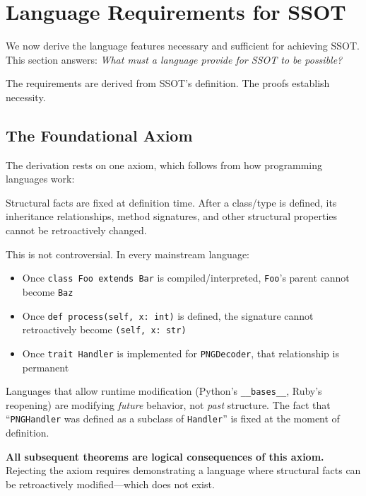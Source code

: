 \section{Language Requirements for SSOT}\label{sec:requirements}

We now derive the language features necessary and sufficient for achieving SSOT. This section answers: \emph{What must a language provide for SSOT to be possible?}

The requirements are derived from SSOT's definition. The proofs establish necessity.

\subsection{The Foundational Axiom}\label{sec:axiom}

The derivation rests on one axiom, which follows from how programming languages work:

\begin{axiom}\label{axiom:fixation}
Structural facts are fixed at definition time. After a class/type is defined, its inheritance relationships, method signatures, and other structural properties cannot be retroactively changed.
\end{axiom}

This is not controversial. In every mainstream language:
\begin{itemize}
\tightlist
\item Once \texttt{class Foo extends Bar} is compiled/interpreted, \texttt{Foo}'s parent cannot become \texttt{Baz}
\item Once \texttt{def process(self, x: int)} is defined, the signature cannot retroactively become \texttt{(self, x: str)}
\item Once \texttt{trait Handler} is implemented for \texttt{PNGDecoder}, that relationship is permanent
\end{itemize}

Languages that allow runtime modification (Python's \texttt{\_\_bases\_\_}, Ruby's reopening) are modifying \emph{future} behavior, not \emph{past} structure. The fact that ``\texttt{PNGHandler} was defined as a subclass of \texttt{Handler}'' is fixed at the moment of definition.

\textbf{All subsequent theorems are logical consequences of this axiom.} Rejecting the axiom requires demonstrating a language where structural facts can be retroactively modified---which does not exist.

